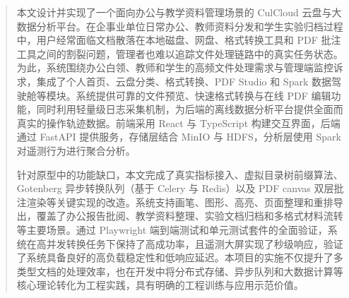 
\begin{abstract}
  本文设计并实现了一个面向办公与教学资料管理场景的 CulCloud 云盘与大数据分析平台。在企事业单位日常办公、教师资料分发和学生实验归档过程中，用户经常面临文档散落在本地磁盘、网盘、格式转换工具和 PDF 批注工具之间的割裂问题，管理者也难以追踪文件处理链路中的真实任务状态。为此，系统围绕办公白领、教师和学生的高频文件处理需求与管理端监控诉求，集成了个人首页、云盘分类、格式转换、PDF Studio 和 Spark 数据驾驶舱等模块。系统提供可靠的文件预览、快速格式转换与在线 PDF 编辑功能，同时利用轻量级日志采集机制，为后端的离线数据分析平台提供全面而真实的操作轨迹数据。前端采用 React 与 TypeScript 构建交互界面，后端通过 FastAPI 提供服务，存储层结合 MinIO 与 HDFS，分析层使用 Spark 对遥测行为进行聚合分析。

  针对原型中的功能缺口，本文完成了真实指标接入、虚拟目录树前缀算法、Gotenberg 异步转换队列（基于 Celery 与 Redis）以及 PDF canvas 双层批注渲染等关键实现的改造。系统支持画笔、图形、高亮、页面整理和重排导出，覆盖了办公报告批阅、教学资料整理、实验文档归档和多格式材料流转等主要场景。通过 Playwright 端到端测试和单元测试套件的全面验证，系统在高并发转换任务下保持了高成功率，且遥测大屏实现了秒级响应，验证了系统具备良好的高负载稳定性和低响应延迟。本项目的实施不仅提升了多类型文档的处理效率，也在开发中将分布式存储、异步队列和大数据计算等核心理论转化为工程实践，具有明确的工程训练与应用示范价值。

\end{abstract}

